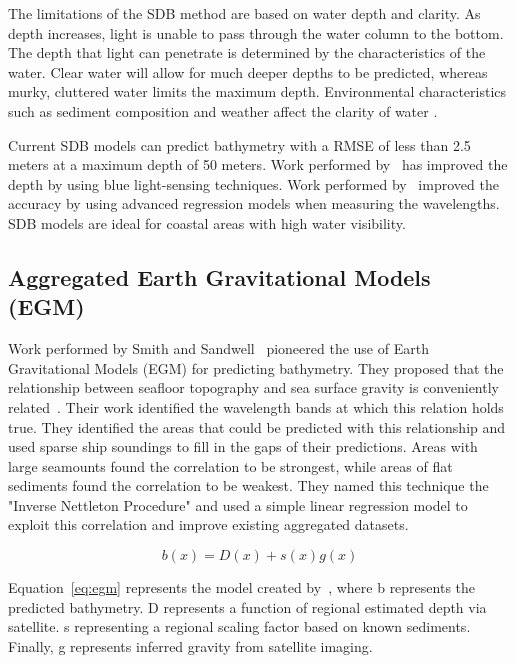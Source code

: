 \par
The limitations of the \ac{SDB} method are based on water depth and clarity.
As depth increases, light is unable to pass through the water column to the bottom.
The depth that light can penetrate is determined by the characteristics of the water.
Clear water will allow for much deeper depths to be predicted, whereas murky, cluttered water limits the maximum depth.
Environmental characteristics such as sediment composition and weather affect the clarity of water \cite{vinayaraj2016satellite}.

\par
Current \ac{SDB} models can predict bathymetry with a \ac{RMSE} of less than 2.5 meters at a maximum depth of 50 meters.
Work performed by~\cite{vinayaraj2016satellite} has improved the depth by using blue light-sensing techniques.
Work performed by~\cite{chybicki2018three} improved the accuracy by using advanced regression models when measuring the wavelengths.
\ac{SDB} models are ideal for coastal areas with high water visibility.

\subsection{Aggregated Earth Gravitational Models (EGM)}
Work performed by Smith and Sandwell~\cite{smith1994bathymetric,smith1997global} pioneered the use of Earth Gravitational Models (EGM) for predicting bathymetry.
They proposed that the relationship between seafloor topography and sea surface gravity is conveniently related~\cite{smith1994bathymetric}.
Their work identified the wavelength bands at which this relation holds true.
They identified the areas that could be predicted with this relationship and used sparse ship soundings to fill in the gaps of their predictions.
Areas with large seamounts found the correlation to be strongest, while areas of flat sediments found the correlation to be weakest.
They named this technique the "Inverse Nettleton Procedure" and used a simple linear regression model to exploit this correlation and improve existing aggregated datasets.

\begin{equation}
    b(x) = D(x) + s(x)g(x) \label{eq:egm}
\end{equation}

\par
Equation~\ref{eq:egm} represents the model created by~\cite{smith1994bathymetric}, where b represents the predicted bathymetry.
D represents a function of regional estimated depth via satellite.
s representing a regional scaling factor based on known sediments.
Finally, g represents inferred gravity from satellite imaging.

